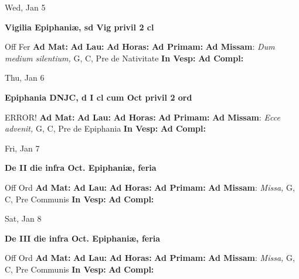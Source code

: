 \documentclass[10pt]{article}
\begin{document}
\begin{minipage}{3.5in}
\vspace{2em}\begin{center}
Wed, Jan 5
\end{center}\textbf{ \large Vigilia Epiphaniæ, \textnormal{\normalsize sd Vig privil 2 cl}}
\begin{justify}
Off Fer
\textbf{Ad Mat: }
\textbf{Ad Lau: }
\textbf{Ad Horas: }
\textbf{Ad Primam: }
\textbf{Ad Missam}: \textit{Dum medium silentium,} G, C, Pre de Nativitate
\textbf{In Vesp: }
\textbf{Ad Compl: }\end{justify}
\end{minipage}



\begin{minipage}{3.5in}
\vspace{2em}\begin{center}
Thu, Jan 6
\end{center}\textbf{ \large Epiphania DNJC, \textnormal{\normalsize d I cl cum Oct privil 2 ord}}
\begin{justify}
ERROR!
\textbf{Ad Mat: }
\textbf{Ad Lau: }
\textbf{Ad Horas: }
\textbf{Ad Primam: }
\textbf{Ad Missam}: \textit{Ecce advenit,} G, C, Pre de Epiphania
\textbf{In Vesp: }
\textbf{Ad Compl: }\end{justify}
\end{minipage}



\begin{minipage}{3.5in}
\vspace{2em}\begin{center}
Fri, Jan 7
\end{center}\textbf{ \large De II die infra Oct. Epiphaniæ, \textnormal{\normalsize feria}}
\begin{justify}
Off Ord
\textbf{Ad Mat: }
\textbf{Ad Lau: }
\textbf{Ad Horas: }
\textbf{Ad Primam: }
\textbf{Ad Missam}: \textit{Missa,} G, C, Pre Communis
\textbf{In Vesp: }
\textbf{Ad Compl: }\end{justify}
\end{minipage}



\begin{minipage}{3.5in}
\vspace{2em}\begin{center}
Sat, Jan 8
\end{center}\textbf{ \large De III die infra Oct. Epiphaniæ, \textnormal{\normalsize feria}}
\begin{justify}
Off Ord
\textbf{Ad Mat: }
\textbf{Ad Lau: }
\textbf{Ad Horas: }
\textbf{Ad Primam: }
\textbf{Ad Missam}: \textit{Missa,} G, C, Pre Communis
\textbf{In Vesp: }
\textbf{Ad Compl: }\end{justify}
\end{minipage}
\end{document}
